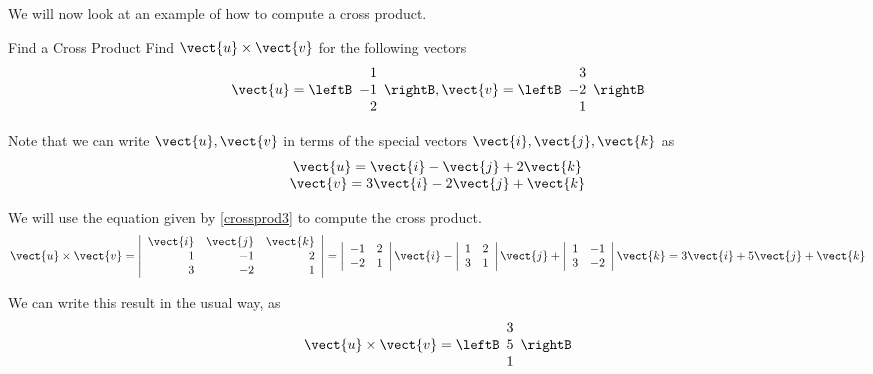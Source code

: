 We will now look at an example of how to compute a cross product.

\begin{example}{Find a Cross Product}\label{exa:findcrossproduct}
Find $\vect{u} \times \vect{v}$ for the following vectors
\begin{equation*}
\vect{u}
=
\leftB
\begin{array}{r}
1 \\
-1 \\
2
\end{array}
\rightB,
\vect{v}
=
\leftB
\begin{array}{r}
3 \\
-2 \\
1
\end{array}
\rightB
\end{equation*}
\end{example}

\begin{solution}
Note that we can write $\vect{u}, \vect{v}$ in terms of the special vectors $\vect{i},
\vect{j}, \vect{k}$ as 
\begin{equation*}
\begin{array}{c}
\vect{u}
=
\vect{i}-\vect{j}+2\vect{k} \\
\vect{v}
=
 3\vect{i}-2\vect{j}+\vect{k}
\end{array}
\end{equation*}

We will use the equation given by \ref{crossprod3} to compute the cross product. 
\begin{equation*}
\vect{u} \times \vect{v}
=
\left\vert
\begin{array}{rrr}
\vect{i} & \vect{j} & \vect{k} \\
1 & -1 & 2 \\
3 & -2 & 1
\end{array}
\right\vert =\left\vert
\begin{array}{rr}
-1 & 2 \\
-2 & 1
\end{array}
\right\vert \vect{i}-\left\vert
\begin{array}{rr}
1 & 2 \\
3 & 1
\end{array}
\right\vert  \vect{j}+\left\vert
\begin{array}{rr}
1 & -1 \\
3 & -2
\end{array}
\right\vert \vect{k}=3\vect{i}+5\vect{j}+\vect{k}
\end{equation*}

We can write this result in the usual way, as
\begin{equation*}
\vect{u} \times \vect{v}
=
\leftB
\begin{array}{r}
3 \\
5 \\
1
\end{array}
\rightB
\end{equation*}

\end{solution}

